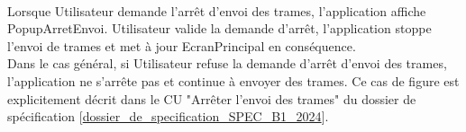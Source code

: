\\
Lorsque Utilisateur demande l'arrêt d'envoi des trames, l'application {\nomApplication} affiche PopupArretEnvoi. Utilisateur valide la demande d'arrêt, l'application {\nomApplication} stoppe l'envoi de trames et met à jour EcranPrincipal en conséquence.\\
Dans le cas général, si Utilisateur refuse la demande d'arrêt d'envoi des trames, l'application {\nomApplication} ne s'arrête pas et continue à envoyer des trames. Ce cas de figure est explicitement décrit dans le CU "Arrêter l'envoi des trames" du dossier de spécification [\hyperref[SPEC]{dossier\_de\_specification\_SPEC\_B1\_2024}].